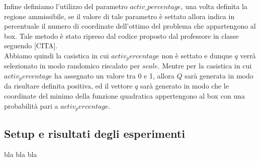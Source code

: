 \documentclass{article}
\begin{document}
Infine definiamo l'utilizzo del parametro $activ\_percentage$, una volta definita la regione ammissibile, se il valore di tale parametro è settato allora indica in percentuale il numero di coordinate dell'ottimo del problema che appartengono al box. Tale metodo è stato ripreso dal codice proposto dal professore in classe seguendo [CITA].\\
Abbiamo quindi la casistica in cui $activ_percentage$ non è settato e dunque $q$ verrà selezionato in modo randomico riscalato per $scale$.
Mentre per la casistica in cui $activ_percentage$ ha assegnato un valore tra 0 e 1, allora $Q$ sarà generata in modo da risultare definita positiva, ed il vettore $q$ sarà generato in modo che le coordinate del minimo della funzione quadratica appertengono al box con una probabilità pari a $activ_percentage$.
\subsection{Setup e risultati degli esperimenti}
bla bla bla


\end{document}
